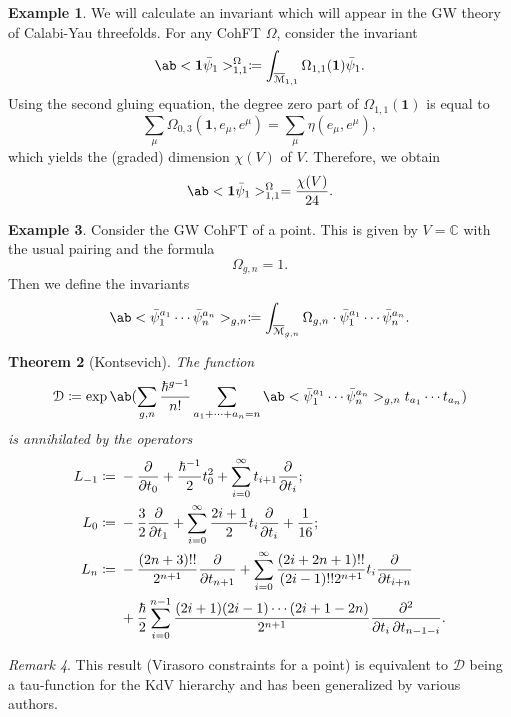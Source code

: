 \documentclass[10pt]{amsart}
\newtheorem{thm}{Theorem}[section]
\theoremstyle{definition}
\newtheorem{exm}[thm]{Example}
\theoremstyle{remark}
\newtheorem{rmk}[thm]{Remark}
\theoremstyle{plain}
\theoremstyle{definition}
\theoremstyle{remark}
\newcommand{\C}{\mathbb{C}}
\newcommand{\Mbar}{\overline{\mathcal{M}}}
\newcommand{\mc}[1]{\mathcal{#1}}
\newcommand{\1}{\mathbf{1}}
\newcommand{\2}{\mathbf{2}}
\newcommand{\3}{\mathbf{3}}
\begin{document}
\begin{exm}
    We will calculate an invariant which will appear in the GW theory of Calabi-Yau threefolds. For any CohFT $\Omega$, consider the invariant
    \[ \ab<\1\bar{\psi}_1>_{1,1}^{\Omega}\coloneqq \int_{\Mbar_{1,1}} \Omega_{1,1}(\1)\bar{\psi}_1. \]
    Using the second gluing equation, the degree zero part of $\Omega_{1,1}(\1)$ is equal to
    \[ \sum_{\mu} \Omega_{0,3}(\1, e_{\mu}, e^{\mu}) = \sum_{\mu} \eta(e_{\mu}, e^{\mu}), \]
    which yields the (graded) dimension $\chi(V)$ of $V$. Therefore, we obtain
    \[ \ab<\1\bar{\psi}_1>_{1,1}^{\Omega} = \frac{\chi(V)}{24}. \]
\end{exm}

\begin{exm}
    Consider the GW CohFT of a point. This is given by $V = \C$ with the usual pairing and the formula 
    \[ \Omega_{g,n} = 1. \]
    Then we define the invariants
    \[ \ab<\bar{\psi}_1^{a_1} \cdots \bar{\psi}_n^{a_n}>_{g,n} \coloneqq \int_{\Mbar_{g,n}} \Omega_{g,n} \cdot \bar{\psi}_1^{a_1} \cdots \bar{\psi}_n^{a_n}. \]
    \begin{thm}[Kontsevich]
        The function
        \[ \mc{D} \coloneqq \exp \ab(\sum_{g,n} \frac{\hbar^{g-1}}{n!}\sum_{a_1 + \cdots + a_n = n} \ab<\bar{\psi}_1^{a_1} \cdots \bar{\psi}_n^{a_n}>_{g,n} t_{a_1}\cdots t_{a_n}) \]
        is annihilated by the operators
        \begin{align*}
            L_{-1} \coloneqq{}& -\pdv{}{t_0} + \frac{\hbar^{-1}}{2} t_0^2 + \sum_{i=0}^{\infty} t_{i+1} \pdv{}{t_i};\\
            L_0 \coloneqq{}& -\frac{3}{2} \pdv{}{t_1} + \sum_{i=0}^{\infty} \frac{2i+1}{2} t_i \pdv{}{t_i} + \frac{1}{16};\\
            L_n \coloneqq{}& -\frac{(2n+3)!!}{2^{n+1}} \pdv{}{t_{n+1}} + \sum_{i=0}^{\infty} \frac{(2i+2n+1)!!}{(2i-1)!! 2^{n+1}} t_i \pdv{}{t_{i+n}} \\
            &+ \frac{\hbar}{2} \sum_{i=0}^{n-1} \frac{(2i+1) (2i-1) \cdots (2i+1-2n)}{2^{n+1}} \pdv{}{t_i,t_{n-1-i}}.
        \end{align*}
    \end{thm}
\end{exm}

\begin{rmk}
    This result (Virasoro constraints for a point) is equivalent to $\mc{D}$ being a tau-function for the KdV hierarchy and has been generalized by various authors.
\end{rmk}
\end{document}
